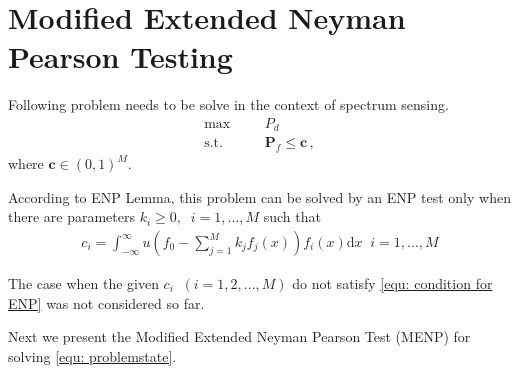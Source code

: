 
\section{Modified Extended Neyman Pearson Testing}

\def \JUDGEMENT{u(f_0(x) - \sum_{j=1}^{M}k_j f_j(x))}

Following problem needs to be solve in the context of spectrum sensing. 
      \begin{equation}
      \label{equ: problemstate}
      \begin{split}
      \max\;\;\;\;\;\;&P_d\\
      \text{s.t.}\;\;\;\;\;\;&\mathbf{P}_f \leq \mathbf{c}\,,
      \end{split}
      \end{equation}
where $\mathbf{c} \in (0, 1)^M$.

According to ENP Lemma, this problem can be solved by an ENP test only when there are parameters $k_i \geq 0, \;\;i=1, ..., M$ such that 
\begin{equation}
\label{equ: condition for ENP}
\begin{split}
c_i = \int_{-\infty}^{\infty}u(f_0 - \sum_{j=1}^{M}k_jf_j(x))f_i(x)\mathrm{d}x \;\;i = 1, ..., M
\end{split}
\end{equation}

The case when the given $c_i\;\; (i= 1, 2, ..., M)$ do not satisfy \eqref{equ: condition for ENP} was not considered so far. 

Next we present the Modified Extended Neyman Pearson Test (MENP) for solving \eqref{equ: problemstate}.

